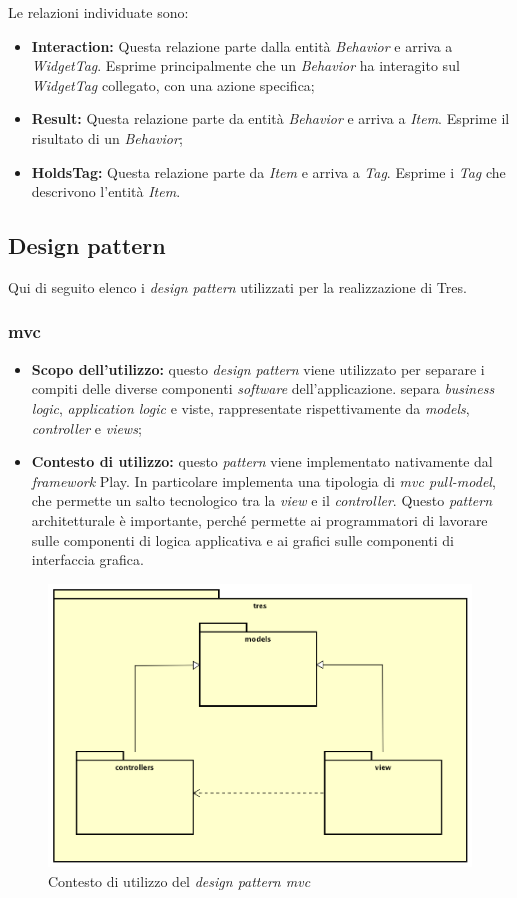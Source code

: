 Le relazioni individuate sono:
\begin{itemize}
\item \textbf{Interaction:} Questa relazione parte dalla entità \emph{Behavior} e arriva a \emph{WidgetTag}. Esprime principalmente che un \emph{Behavior} ha interagito sul \emph{WidgetTag} collegato, con una azione specifica;
\item \textbf{Result:} Questa relazione parte da entità \emph{Behavior} e arriva a \emph{Item}. Esprime il risultato di un \emph{Behavior};
\item \textbf{HoldsTag:} Questa relazione parte da \emph{Item} e arriva a \emph{Tag}. Esprime i \emph{Tag} che descrivono l'entità \emph{Item}.
\end{itemize}
\newpage
\subsection{Design pattern}
Qui di seguito elenco i \emph{design pattern} utilizzati per la realizzazione di Tres.
\subsubsection{\gls{mvc}}
\begin{itemize}
\item\textbf{Scopo dell'utilizzo:} questo \emph{design pattern} viene utilizzato per separare i compiti delle diverse componenti \emph{software} dell'applicazione. separa \emph{business logic}, \emph{application logic} e viste, rappresentate rispettivamente da \emph{models}, \emph{controller} e \emph{views};
\item \textbf{Contesto di utilizzo:} questo \emph{pattern} viene implementato nativamente dal \emph{framework} Play. In particolare implementa una tipologia di \emph{\gls{mvc} pull-model}, che permette un salto tecnologico tra la \emph{view} e il \emph{controller}. Questo \emph{pattern} architetturale è importante, perché permette ai programmatori di lavorare sulle componenti di logica applicativa e ai grafici sulle componenti di interfaccia grafica.
\end{itemize}
\begin{figure}[h]
\centering
\includegraphics[scale=0.30]{immagini/mvc}
\caption{Contesto di utilizzo del \emph{design pattern \gls{mvc}}}
\label{fig:pattern-mvc}
\end{figure}
